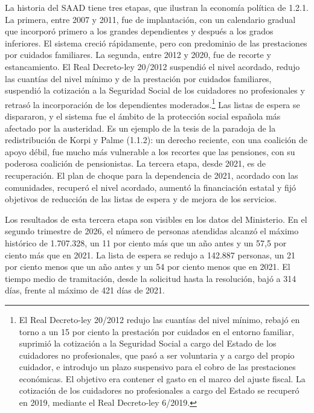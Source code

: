 \documentclass[10pt,a4paper]{article}
\begin{document}
La historia del SAAD tiene tres etapas, que ilustran la economía política de 1.2.1. La primera, entre 2007 y 2011, fue de implantación, con un calendario gradual que incorporó primero a los grandes dependientes y después a los grados inferiores. El sistema creció rápidamente, pero con predominio de las prestaciones por cuidados familiares. La segunda, entre 2012 y 2020, fue de recorte y estancamiento. El Real Decreto-ley 20/2012 suspendió el nivel acordado, redujo las cuantías del nivel mínimo y de la prestación por cuidados familiares, suspendió la cotización a la Seguridad Social de los cuidadores no profesionales y retrasó la incorporación de los dependientes moderados.\footnote{%
    El Real Decreto-ley 20/2012 redujo las cuantías del nivel mínimo, rebajó en torno a un 15 por ciento la prestación por cuidados en el entorno familiar, suprimió la cotización a la Seguridad Social a cargo del Estado de los cuidadores no profesionales, que pasó a ser voluntaria y a cargo del propio cuidador, e introdujo un plazo suspensivo para el cobro de las prestaciones económicas. El objetivo era contener el gasto en el marco del ajuste fiscal. La cotización de los cuidadores no profesionales a cargo del Estado se recuperó en 2019, mediante el Real Decreto-ley 6/2019.
} Las listas de espera se dispararon, y el sistema fue el ámbito de la protección social española más afectado por la austeridad. Es un ejemplo de la tesis de la paradoja de la redistribución de Korpi y Palme (1.1.2): un derecho reciente, con una coalición de apoyo débil, fue mucho más vulnerable a los recortes que las pensiones, con su poderosa coalición de pensionistas. La tercera etapa, desde 2021, es de recuperación. El plan de choque para la dependencia de 2021, acordado con las comunidades, recuperó el nivel acordado, aumentó la financiación estatal y fijó objetivos de reducción de las listas de espera y de mejora de los servicios.

Los resultados de esta tercera etapa son visibles en los datos del Ministerio. En el segundo trimestre de 2026, el número de personas atendidas alcanzó el máximo histórico de 1.707.328, un 11 por ciento más que un año antes y un 57,5 por ciento más que en 2021. La lista de espera se redujo a 142.887 personas, un 21 por ciento menos que un año antes y un 54 por ciento menos que en 2021. El tiempo medio de tramitación, desde la solicitud hasta la resolución, bajó a 314 días, frente al máximo de 421 días de 2021.
\end{document}
